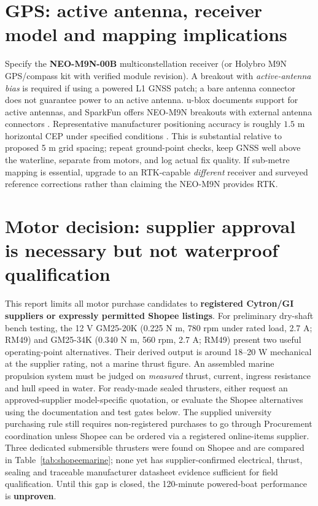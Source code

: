 \documentclass[10pt,a4paper]{article}
\begin{document}
\section{GPS: active antenna, receiver model and mapping implications}
Specify the \textbf{NEO-M9N-00B} multiconstellation receiver (or Holybro M9N GPS/compass kit with verified module revision). A breakout with \emph{active-antenna bias} is required if using a powered L1 GNSS patch; a bare antenna connector does not guarantee power to an active antenna. u-blox documents support for active antennas, and SparkFun offers NEO-M9N breakouts with external antenna connectors \cite{M9N,SparkM9N}. Representative manufacturer positioning accuracy is roughly $1.5$ m horizontal CEP under specified conditions \cite{M9N}. This is substantial relative to proposed 5 m grid spacing; repeat ground-point checks, keep GNSS well above the waterline, separate from motors, and log actual fix quality. If sub-metre mapping is essential, upgrade to an RTK-capable \emph{different} receiver and surveyed reference corrections rather than claiming the NEO-M9N provides RTK.

\section{Motor decision: supplier approval is necessary but not waterproof qualification}
This report limits all motor purchase candidates to \textbf{registered Cytron/GI suppliers or expressly permitted Shopee listings}. For preliminary dry-shaft bench testing, the 12 V GM25-20K (0.225 N m, 780 rpm under rated load, 2.7 A; RM49) and GM25-34K (0.340 N m, 560 rpm, 2.7 A; RM49) present two useful operating-point alternatives. Their derived output is around 18--20 W mechanical at the supplier rating, not a marine thrust figure. An assembled marine propulsion system must be judged on \emph{measured} thrust, current, ingress resistance and hull speed in water. For ready-made sealed thrusters, either request an approved-supplier model-specific quotation, or evaluate the Shopee alternatives using the documentation and test gates below. The supplied university purchasing rule still requires non-registered purchases to go through Procurement coordination unless Shopee can be ordered via a registered online-items supplier. Three dedicated submersible thrusters were found on Shopee and are compared in Table~\ref{tab:shopeemarine}; none yet has supplier-confirmed electrical, thrust, sealing and traceable manufacturer datasheet evidence sufficient for field qualification. Until this gap is closed, the 120-minute powered-boat performance is \textbf{unproven}.
\end{document}
